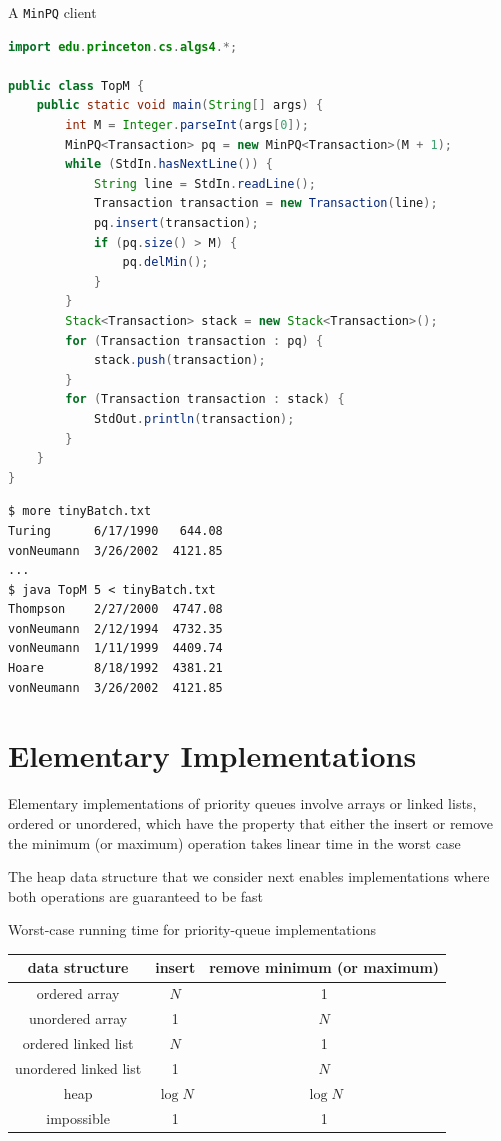 \documentclass[8pt,a4paper,compress]{beamer}
\begin{document}
\begin{frame}[fragile]
\pause

A \lstinline{MinPQ} client
\begin{lstlisting}[language=Java]
import edu.princeton.cs.algs4.*;

public class TopM {   
    public static void main(String[] args) {
        int M = Integer.parseInt(args[0]); 
        MinPQ<Transaction> pq = new MinPQ<Transaction>(M + 1); 
        while (StdIn.hasNextLine()) {
            String line = StdIn.readLine();
            Transaction transaction = new Transaction(line);
            pq.insert(transaction); 
            if (pq.size() > M) { 
                pq.delMin(); 
            }
        }
        Stack<Transaction> stack = new Stack<Transaction>();
        for (Transaction transaction : pq) { 
            stack.push(transaction); 
        }
        for (Transaction transaction : stack) {
            StdOut.println(transaction); 
        } 
    }
} 
\end{lstlisting} 

\pause

\begin{lstlisting}[language={}]
$ more tinyBatch.txt 
Turing      6/17/1990   644.08
vonNeumann  3/26/2002  4121.85
...
$ java TopM 5 < tinyBatch.txt 
Thompson    2/27/2000  4747.08
vonNeumann  2/12/1994  4732.35
vonNeumann  1/11/1999  4409.74
Hoare       8/18/1992  4381.21
vonNeumann  3/26/2002  4121.85
\end{lstlisting} 
\end{frame}

\section{Elementary Implementations}
\begin{frame}[fragile]
\pause

Elementary implementations of priority queues involve arrays or linked lists, ordered or unordered, which have the property that either the insert or remove the minimum (or maximum) operation takes linear time in the worst case

\pause
\bigskip

The heap data structure that we consider next enables implementations where both operations are guaranteed to be fast

\pause
\bigskip

Worst-case running time for priority-queue implementations
\begin{center}
\begin{tabular}{ccc}
data structure & insert & remove minimum (or maximum) \\ \hline
ordered array & $N$ & 1 \\
unordered array & 1 & $N$ \\
ordered linked list & $N$ & 1 \\
unordered linked list & 1 & $N$ \\
heap & $\log N$ & $\log N$ \\
impossible & 1 & 1
\end{tabular} 
\end{center}
\end{frame}
\end{document}
